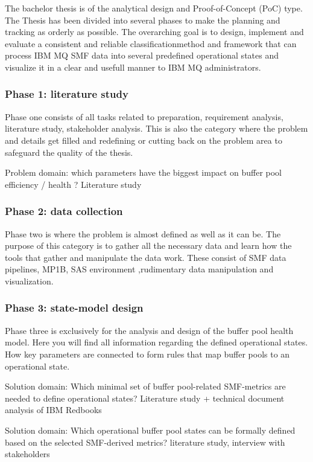 The bachelor thesis is of the analytical design and Proof-of-Concept (PoC) type.
The Thesis has been divided into several phases to make the planning and tracking as orderly as possible. The overarching goal is to design, implement and evaluate a consistent and reliable classificationmethod and framework that can process IBM MQ SMF data into several predefined operational states and visualize it in a clear and usefull manner to IBM MQ administrators.

\subsubsection{Phase 1: literature study}
Phase one consists of all tasks related to preparation, requirement analysis, literature study, stakeholder analysis. This is also the category where the problem and details get filled and redefining or cutting back on the problem area to safeguard the quality of the thesis. 

Problem domain: which parameters have the biggest impact on buffer pool efficiency / health ?
Literature study

\subsubsection{Phase 2: data collection}
Phase two is where the problem is almost defined as well as it can be. The purpose of this category is to gather all the necessary data and learn how the tools that gather and manipulate the data work. These consist of SMF data pipelines, MP1B, SAS environment ,rudimentary data manipulation and visualization. 

\subsubsection{Phase 3: state-model design}
Phase three is exclusively for the analysis and design of the buffer pool health model. 
Here you will find all information regarding the defined operational states. How key parameters are connected to form rules that map buffer pools to an operational state. 

Solution domain: Which minimal set of buffer pool-related SMF-metrics are needed to define
operational states?
Literature study + technical document analysis of IBM Redbooks

Solution domain: Which operational buffer pool states can be formally defined based on the selected SMF-derived metrics?
literature study, interview with stakeholders

